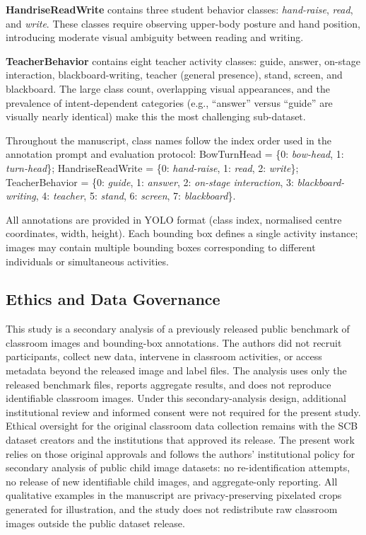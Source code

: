\documentclass{ieeeaccess}
\begin{document}
\textbf{HandriseReadWrite} contains three student behavior classes:
\textit{hand-raise}, \textit{read}, and \textit{write}.
These classes require observing upper-body posture and hand position,
introducing moderate visual ambiguity between reading and writing.

\textbf{TeacherBehavior} contains eight teacher activity classes:
guide, answer, on-stage interaction, blackboard-writing, teacher
(general presence), stand, screen, and
blackboard.
The large class count, overlapping visual appearances, and the
prevalence of intent-dependent categories (e.g., ``answer'' versus
``guide'' are visually nearly identical) make this the most
challenging sub-dataset.

Throughout the manuscript, class names follow the index order used in
the annotation prompt and evaluation protocol:
BowTurnHead = \{0: \textit{bow-head}, 1: \textit{turn-head}\};
HandriseReadWrite = \{0: \textit{hand-raise}, 1: \textit{read},
2: \textit{write}\};
TeacherBehavior = \{0: \textit{guide}, 1: \textit{answer},
2: \textit{on-stage interaction}, 3: \textit{blackboard-writing},
4: \textit{teacher}, 5: \textit{stand}, 6: \textit{screen},
7: \textit{blackboard}\}.

All annotations are provided in YOLO format (class index, normalised
centre coordinates, width, height).
Each bounding box defines a single activity instance; images may
contain multiple bounding boxes corresponding to different individuals
or simultaneous activities.

\subsection{Ethics and Data Governance}

This study is a secondary analysis of a previously released public
benchmark of classroom images and bounding-box annotations.
The authors did not recruit participants, collect new data, intervene
in classroom activities, or access metadata beyond the released image
and label files.
The analysis uses only the released benchmark files, reports aggregate
results, and does not reproduce identifiable classroom images.
Under this secondary-analysis design, additional institutional review
and informed consent were not required for the present study.
Ethical oversight for the original classroom data collection remains
with the SCB dataset creators and the institutions that approved its
release.
The present work relies on those original approvals and follows the
authors' institutional policy for secondary analysis of public child
image datasets: no re-identification attempts, no release of new
identifiable child images, and aggregate-only reporting.
All qualitative examples in the manuscript are privacy-preserving
pixelated crops generated for illustration, and the study does not
redistribute raw classroom images outside the public dataset release.
\end{document}

